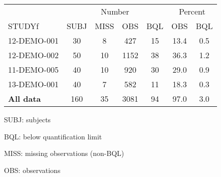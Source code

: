 \setlength{\tabcolsep}{5pt} 
\begin{threeparttable}
\renewcommand{\arraystretch}{1.3}
\begin{tabular}[h]{lcccccc}
\hline
\multicolumn{1}{c}{} & \multicolumn{4}{c}{Number} & \multicolumn{2}{c}{Percent} \\
\cmidrule(lr){2-5}
\cmidrule(lr){6-7}
STUDYf & SUBJ & MISS & OBS & BQL & OBS & BQL \\
\hline
12-DEMO-001 & 30 & 8 & 427 & 15 & 13.4 & 0.5 \\
12-DEMO-002 & 50 & 10 & 1152 & 38 & 36.3 & 1.2 \\
11-DEMO-005 & 40 & 10 & 920 & 30 & 29.0 & 0.9 \\
13-DEMO-001 & 40 & 7 & 582 & 11 & 18.3 & 0.3 \\
\hline \hline {\bf All data} & 160 & 35 & 3081 & 94 & 97.0 & 3.0 \\
\hline
\end{tabular}
\begin{tablenotes}[flushleft]
\item SUBJ: subjects
\item BQL: below quantification limit
\item MISS: missing observations (non-BQL)
\item OBS: observations
\end{tablenotes}
\end{threeparttable}
